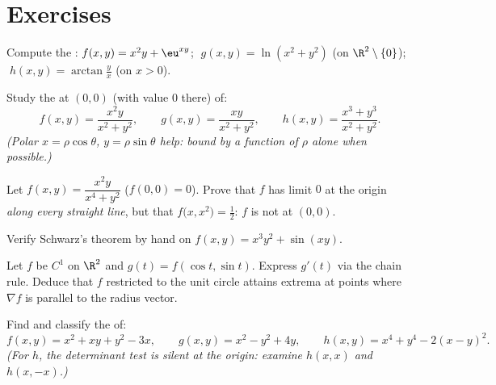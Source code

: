 \section{Exercises}

\begin{exercise}[$\star$]\label{exo:b1:multivar:1}
Compute the :
$f(x,y) = x^2 y + \eu^{xy}$; $\;g(x,y) = \ln(x^2 + y^2)$ (on
$\R^2\setminus\{0\}$); $\;h(x,y) = \arctan\frac yx$ (on $x > 0$).
\end{exercise}

\begin{exercise}[$\star$]\label{exo:b1:multivar:2}
Study the  at $(0,0)$ (with value $0$ there) of:
\[
f(x,y) = \frac{x^2 y}{x^2 + y^2},
\qquad
g(x,y) = \frac{xy}{x^2 + y^2},
\qquad
h(x,y) = \frac{x^3 + y^3}{x^2 + y^2}.
\]
\emph{(Polar  $x = \rho\cos\theta$, $y = \rho\sin\theta$
help: bound by a function of $\rho$ alone when possible.)}
\end{exercise}

\begin{exercise}[$\star\star$]\label{exo:b1:multivar:3}
Let $f(x,y) = \dfrac{x^2 y}{x^4 + y^2}$ ($f(0,0) = 0$). Prove that
$f$ has limit $0$ at the origin \emph{along every straight line},
but that $f\bigl(x, x^2\bigr) = \frac12$: $f$ is not  at
$(0,0)$.
\end{exercise}

\begin{exercise}[$\star$]\label{exo:b1:multivar:4}
Verify Schwarz's theorem by hand on $f(x, y) = x^3 y^2 + \sin(xy)$.
\end{exercise}

\begin{exercise}[$\star\star$]\label{exo:b1:multivar:5}
Let $f$ be $C^1$ on $\R^2$ and $g(t) = f(\cos t, \sin t)$. Express
$g'(t)$ via the chain rule. Deduce that $f$ restricted to the unit
circle attains extrema at points where $\nabla f$ is parallel to
the radius vector.
\end{exercise}

\begin{exercise}[$\star\star$]\label{exo:b1:multivar:6}
Find and classify the  of:
\[
f(x, y) = x^2 + xy + y^2 - 3x,
\qquad
g(x, y) = x^2 - y^2 + 4y,
\qquad
h(x, y) = x^4 + y^4 - 2(x - y)^2 .
\]
\emph{(For $h$, the determinant test is silent at the origin:
examine $h(x, x)$ and $h(x, -x)$.)}
\end{exercise}

